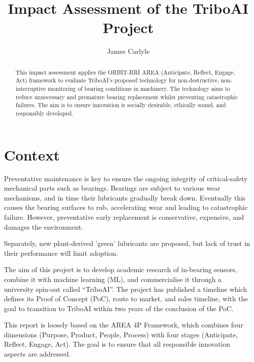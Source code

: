 \documentclass[runningheads]{llncs}
\begin{document}
\title{Impact Assessment of the TriboAI Project}
\author{James Carlyle}
\maketitle              
\begin{abstract}
    This impact assessment applies the ORBIT-RRI AREA (Anticipate, Reflect, Engage, Act) framework to evaluate TriboAI's proposed technology for non-destructive, non-interruptive monitoring of bearing conditions in machinery. The technology aims to reduce unnecessary and premature bearing replacement whilst preventing catastrophic failures. The aim is to ensure innovation is socially desirable, ethically sound, and responsibly developed.

\end{abstract}

\section{Context}
    Preventative maintenance is key to ensure the ongoing integrity of critical-safety mechanical parts such as bearings. Bearings are subject to various wear mechanisms, and in time their lubricants gradually break down. Eventually this causes the bearing surfaces to rub, accelerating wear and leading to catastrophic failure. However, preventative early replacement is conservative, expensive, and damages the environment. 
    
    Separately, new plant-derived 'green' lubricants are proposed, but lack of trust in their performance will limit adoption. 
    
    The aim of this project is to develop academic research of in-bearing sensors, combine it with machine learning (ML), and commercialise it through a university spin-out called \enquote{TriboAI}. The project has published a timeline which defines its Proof of Concept (PoC), route to market, and sales timeline, with the goal to transition to TriboAI within two years of the conclusion of the PoC. 
    
    This report is loosely based on the AREA 4P Framework, which combines four dimensions (Purpose, Product, People, Process) with four stages (Anticipate, Reflect, Engage, Act). The goal is to ensure that all responsible innovation aspects are addressed.
\end{document}
